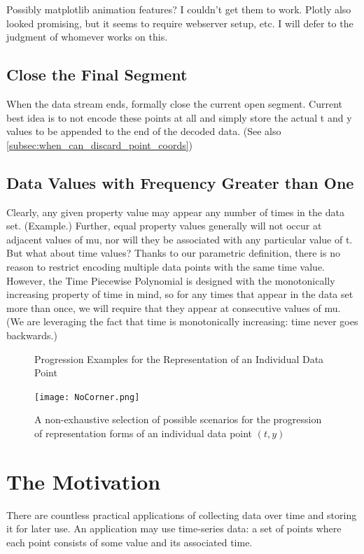 \documentclass{article}
\begin{document}
Possibly matplotlib animation features? I couldn’t get them to work. Plotly also looked promising, but it seems to require webserver setup, etc.
I will defer to the judgment of whomever works on this.


\subsection{Close the Final Segment}
\label{subsec:close_the_final_segment}
When the data stream ends, formally close the current open segment. Current best idea is to not encode these points at all and simply store the actual t and y values to be appended to the end of the decoded data. (See also \ref{subsec:when_can_discard_point_coords})


\subsection{Data Values with Frequency Greater than One}
Clearly, any given property value may appear any number of times in the data set. (Example.) Further, equal property values generally will not occur at adjacent values of mu, nor will they be associated with any particular value of t.
But what about time values? Thanks to our parametric definition, there is no reason to restrict encoding multiple data points with the same time value. However, the Time Piecewise Polynomial is designed with the monotonically increasing property of time in mind, so for any times that appear in the data set more than once, we will require that they appear at consecutive values of mu. 
(We are leveraging the fact that time is monotonically increasing: time never goes backwards.)



\begin{figure}
    \centering
    \caption*{Progression Examples for the Representation of an Individual Data Point}
    \texttt{[image: NoCorner.png]}
    \caption{A non-exhaustive selection of possible scenarios for the progression of representation forms of an individual data point \((t,y)\)}
    \label{fig:does_not_create_a_corner}
\end{figure}


\newpage
\newpage
\mbox{} %



\section{The Motivation}
\label{sec:the_motivation}
There are countless practical applications of collecting data over time and storing it for later use. An application may use time-series data: a set of points where each point consists of some value and its associated time.
\end{document}
